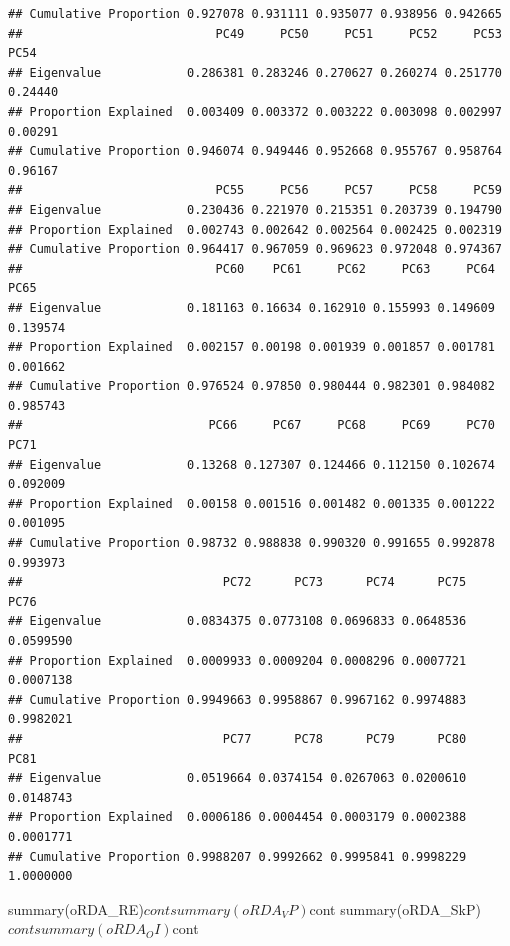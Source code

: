 \documentclass[]{article}
\begin{document}
\begin{verbatim}
## Cumulative Proportion 0.927078 0.931111 0.935077 0.938956 0.942665
##                           PC49     PC50     PC51     PC52     PC53    PC54
## Eigenvalue            0.286381 0.283246 0.270627 0.260274 0.251770 0.24440
## Proportion Explained  0.003409 0.003372 0.003222 0.003098 0.002997 0.00291
## Cumulative Proportion 0.946074 0.949446 0.952668 0.955767 0.958764 0.96167
##                           PC55     PC56     PC57     PC58     PC59
## Eigenvalue            0.230436 0.221970 0.215351 0.203739 0.194790
## Proportion Explained  0.002743 0.002642 0.002564 0.002425 0.002319
## Cumulative Proportion 0.964417 0.967059 0.969623 0.972048 0.974367
##                           PC60    PC61     PC62     PC63     PC64     PC65
## Eigenvalue            0.181163 0.16634 0.162910 0.155993 0.149609 0.139574
## Proportion Explained  0.002157 0.00198 0.001939 0.001857 0.001781 0.001662
## Cumulative Proportion 0.976524 0.97850 0.980444 0.982301 0.984082 0.985743
##                          PC66     PC67     PC68     PC69     PC70     PC71
## Eigenvalue            0.13268 0.127307 0.124466 0.112150 0.102674 0.092009
## Proportion Explained  0.00158 0.001516 0.001482 0.001335 0.001222 0.001095
## Cumulative Proportion 0.98732 0.988838 0.990320 0.991655 0.992878 0.993973
##                            PC72      PC73      PC74      PC75      PC76
## Eigenvalue            0.0834375 0.0773108 0.0696833 0.0648536 0.0599590
## Proportion Explained  0.0009933 0.0009204 0.0008296 0.0007721 0.0007138
## Cumulative Proportion 0.9949663 0.9958867 0.9967162 0.9974883 0.9982021
##                            PC77      PC78      PC79      PC80      PC81
## Eigenvalue            0.0519664 0.0374154 0.0267063 0.0200610 0.0148743
## Proportion Explained  0.0006186 0.0004454 0.0003179 0.0002388 0.0001771
## Cumulative Proportion 0.9988207 0.9992662 0.9995841 0.9998229 1.0000000
\end{verbatim}

summary(oRDA\_RE)\(cont summary(oRDA_VP)\)cont
summary(oRDA\_SkP)\(cont summary(oRDA_OI)\)cont
\end{document}
